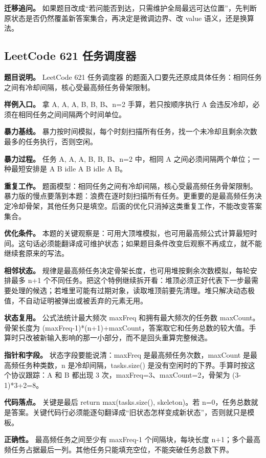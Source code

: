 \textbf{迁移追问。} 如果题目改成“若问能否到达，只需维护全局最远可达位置”，先判断原状态是否仍然覆盖新答案集合，再决定是微调边界、改 value 语义，还是换算法。

\subsection{LeetCode 621 任务调度器}

\textbf{题目说明。} LeetCode 621 任务调度器 的题面入口要先还原成具体任务：相同任务之间有冷却间隔，核心受最高频任务骨架限制。

\textbf{样例入口。} 拿 A, A, A, B, B, B、n=2 手算，若只按顺序执行 A 会违反冷却，必须在相同任务之间间隔两个时间单位。

\textbf{暴力基线。} 暴力按时间模拟，每个时刻扫描所有任务，找一个未冷却且剩余次数最多的任务执行，否则空闲。

\textbf{暴力过程。} 任务 A, A, A, B, B, B、n=2 中，相同 A 之间必须间隔两个单位；一种最短安排是 A B idle A B idle A B。

\textbf{重复工作。} 题面模型：相同任务之间有冷却间隔，核心受最高频任务骨架限制。暴力版的慢点要落到本题：浪费在逐时刻扫描所有任务。更重要的是最高频任务决定冷却骨架，其他任务只是填空。后面的优化只消掉这类重复工作，不能改变答案集合。

\textbf{优化条件。} 本题的关键观察是：可用大顶堆模拟，也可用最高频公式计算最短时间。这句话必须能翻译成可维护状态；如果题目条件改变后观察不再成立，就不能继续套原来的写法。

\textbf{相邻状态。} 规律是最高频任务决定骨架长度，也可用堆按剩余次数模拟，每轮安排最多 n+1 个不同任务。把这个特例继续拆开看：堆顶必须正好代表下一步最需要处理的候选；若堆里可能有过期对象，读取堆顶前要先清理。堆只解决动态极值，不自动证明被弹出或被丢弃的元素无用。

\textbf{状态复用。} 公式法统计最大频次 maxFreq 和拥有最大频次的任务数 maxCount。骨架长度为 (maxFreq-1)*(n+1)+maxCount，答案取它和任务总数的较大值。手算时只改被新输入影响的那一小部分，而不是回头重算完整候选。

\textbf{指针和字段。} 状态字段要能说清：maxFreq 是最高频任务次数，maxCount 是最高频任务种类数，n 是冷却间隔，tasks.size() 是没有空闲时的下界。手算时按这个协议跟踪：A 和 B 都出现 3 次，maxFreq=3、maxCount=2，骨架为 (3-1)*3+2=8。

\textbf{代码落点。} 关键是最后 return max(tasks.size(), skeleton)。若 n=0，任务总数就是答案。关键代码行必须能逐句翻译成“旧状态怎样变成新状态”，否则就只是模板。

\textbf{正确性。} 最高频任务之间至少有 maxFreq-1 个间隔块，每块长度 n+1；多个最高频任务占据最后一列。其他任务只能填充空位，不能突破任务总数下界。

